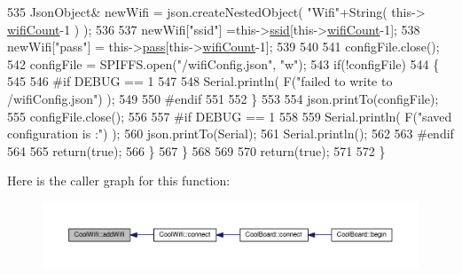 \begin{DoxyCode}
535             JsonObject& newWifi = json.createNestedObject( \textcolor{stringliteral}{"Wifi"}+String( this->
      \hyperlink{classCoolWifi_ab133bd92fcb895b884deecd6678592e4}{wifiCount}-1 ) );
536             
537             newWifi[\textcolor{stringliteral}{"ssid"}] =this->\hyperlink{classCoolWifi_a893b21d0fed821438733bba2e73fb4c2}{ssid}[this->\hyperlink{classCoolWifi_ab133bd92fcb895b884deecd6678592e4}{wifiCount}-1];
538             newWifi[\textcolor{stringliteral}{"pass"}] = this->\hyperlink{classCoolWifi_a0c3332a149245aaad060b32593a54c9b}{pass}[this->\hyperlink{classCoolWifi_ab133bd92fcb895b884deecd6678592e4}{wifiCount}-1];
539             
540 
541             configFile.close();
542             configFile = SPIFFS.open(\textcolor{stringliteral}{"/wifiConfig.json"}, \textcolor{stringliteral}{"w"});
543             \textcolor{keywordflow}{if}(!configFile)
544             \{
545             
546 \textcolor{preprocessor}{            #if DEBUG == 1 }
547 
548                 Serial.println( F(\textcolor{stringliteral}{"failed to write to /wifiConfig.json"}) );
549             
550 \textcolor{preprocessor}{            #endif}
551 
552             \}
553             
554             json.printTo(configFile);
555             configFile.close();
556 
557 \textcolor{preprocessor}{        #if DEBUG == 1 }
558 
559             Serial.println( F(\textcolor{stringliteral}{"saved configuration is :"}) );
560             json.printTo(Serial);
561             Serial.println();
562         
563 \textcolor{preprocessor}{        #endif}
564 
565             \textcolor{keywordflow}{return}(\textcolor{keyword}{true}); 
566         \}
567     \}   
568 
569     
570     \textcolor{keywordflow}{return}(\textcolor{keyword}{true});
571     
572 \}
\end{DoxyCode}
Here is the caller graph for this function\+:
\nopagebreak
\begin{figure}[H]
\begin{center}
\leavevmode
\includegraphics[width=350pt]{classCoolWifi_a914d7a1df14dd6b75345fb614c34e9d6_icgraph}
\end{center}
\end{figure}
\mbox{\label{classCoolWifi_a46942fed90e475112cc10b78a32e7aaa}} 
